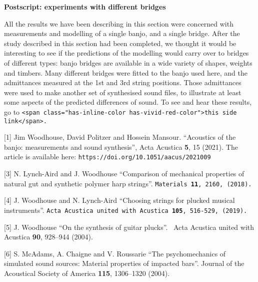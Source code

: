   \textbf{Postscript: experiments with different bridges} 

  All the results we have been describing in this section were concerned with 
  measurements and modelling of a single banjo, and a single bridge. After the 
  study described in this section had been completed, we thought it would be 
  interesting to see if the predictions of the modelling would carry over to 
  bridges of different types: banjo bridges are available in a wide variety of 
  shapes, weights and timbers. Many different bridges were fitted to the banjo 
  used here, and the admittances measured at the 1st and 3rd string positions. 
  Those admittances were used to make another set of synthesised sound files, 
  to illustrate at least some aspects of the predicted differences of sound. To 
  see and hear these results, go to \tt{}<span class="has-inline-color 
  has-vivid-red-color">this side link</span>\rm{}. 



  \sectionreferences{}[1] Jim Woodhouse, David Politzer and Hossein Mansour. 
  ``Acoustics of the banjo: measurements and sound synthesis'', Acta Acustica 
  \textbf{5}, 15 (2021). The article is available here: 
  \tt{}https://doi.org/10.1051/aacus/2021009\rm{} 

  [3] N. Lynch-Aird and J. Woodhouse ``Comparison of mechanical properties of 
  natural gut and synthetic polymer harp strings''. \tt{}Materials \textbf{11}, 
  2160, (2018)\rm{}.~ 

  [4] J. Woodhouse and N. Lynch-Aird ``Choosing strings for plucked musical 
  instruments''. \tt{}Acta Acustica united with Acustica \textbf{105}, 516-529, 
  (2019)\rm{}.~ 

  [5] J. Woodhouse ``On the synthesis of guitar plucks''.~ Acta Acustica united 
  with Acustica \textbf{90}, 928–944 (2004). 

  [6] S. McAdams, A. Chaigne and V. Roussarie ``The psychomechanics of 
  simulated sound sources: Material properties of impacted bars''. Journal of 
  the Acoustical Society of America \textbf{115}, 1306--1320 (2004). 